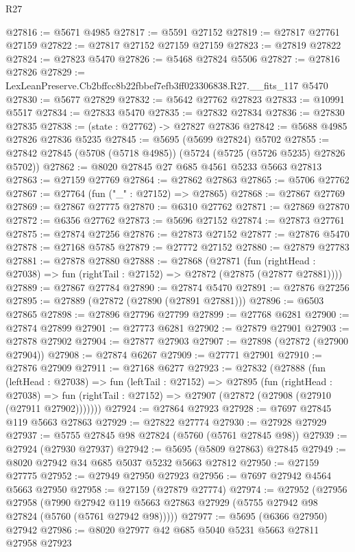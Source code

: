 \begin{lexlean}{R27}
\begin{coremodule}
@27816 := @5671 @4985
@27817 := @5591 @27152
@27819 := @27817 @27761 @27159
@27822 := @27817 @27152 @27159 @27159
@27823 := @27819 @27822
@27824 := @27823 @5470
@27826 := @5468 @27824 @5506
@27827 := @27816 @27826
@27829 := LexLeanPreserve.Cb2bffcc8b22fbbef7efb3ff023306838.R27.__fits_117 @5470
@27830 := @5677 @27829
@27832 := @5642 @27762 @27823
@27833 := @10991 @5517
@27834 := @27833 @5470
@27835 := @27832 @27834
@27836 := @27830 @27835
@27838 := (state : @27762) -> @27827 @27836
@27842 := @5688 @4985 @27826 @27836 @5235
@27845 := @5695 (@5699 @27824) @5702
@27855 := @27842 @27845 (@5708 (@5718 @4985)) (@5724 (@5725 (@5726 @5235) @27826 @5702))
@27862 := @8020 @27845 @27 @685 @4561 @5233 @5663 @27813
@27863 := @27159 @27769
@27864 := @27862 @27863
@27865 := @5706 @27762
@27867 := @27764 (fun ("_" : @27152) => @27865)
@27868 := @27867 @27769
@27869 := @27867 @27775
@27870 := @6310 @27762
@27871 := @27869 @27870
@27872 := @6356 @27762
@27873 := @5696 @27152
@27874 := @27873 @27761
@27875 := @27874 @27256
@27876 := @27873 @27152
@27877 := @27876 @5470
@27878 := @27168 @5785
@27879 := @27772 @27152
@27880 := @27879 @27783
@27881 := @27878 @27880
@27888 := @27868
    (@27871
      (fun (rightHead : @27038) => fun (rightTail : @27152) => @27872 (@27875 (@27877 @27881))))
@27889 := @27867 @27784
@27890 := @27874 @5470
@27891 := @27876 @27256
@27895 := @27889 (@27872 (@27890 (@27891 @27881)))
@27896 := @6503 @27865
@27898 := @27896 @27796 @27799
@27899 := @27768 @6281
@27900 := @27874 @27899
@27901 := @27773 @6281
@27902 := @27879 @27901
@27903 := @27878 @27902
@27904 := @27877 @27903
@27907 := @27898 (@27872 (@27900 @27904))
@27908 := @27874 @6267
@27909 := @27771 @27901
@27910 := @27876 @27909
@27911 := @27168 @6277
@27923 := @27832
    (@27888
      (fun (leftHead : @27038) =>
      fun (leftTail : @27152) =>
      @27895
        (fun (rightHead : @27038) =>
        fun (rightTail : @27152) => @27907 (@27872 (@27908 (@27910 (@27911 @27902)))))))
@27924 := @27864 @27923
@27928 := @7697 @27845 @119 @5663 @27863
@27929 := @27822 @27774
@27930 := @27928 @27929
@27937 := @5755 @27845 @98 @27824 (@5760 (@5761 @27845 @98))
@27939 := @27924 (@27930 @27937)
@27942 := @5695 (@5809 @27863) @27845
@27949 := @8020 @27942 @34 @685 @5037 @5232 @5663 @27812
@27950 := @27159 @27775
@27952 := @27949 @27950 @27923
@27956 := @7697 @27942 @4564 @5663 @27950
@27958 := @27159 (@27879 @27774)
@27974 := @27952
    (@27956
      @27958
      (@7990 @27942 @119 @5663 @27863 @27929 (@5755 @27942 @98 @27824 (@5760 (@5761 @27942 @98)))))
@27977 := @5695 (@6366 @27950) @27942
@27986 := @8020 @27977 @42 @685 @5040 @5231 @5663 @27811 @27958 @27923

\end{coremodule}
\end{lexlean}
